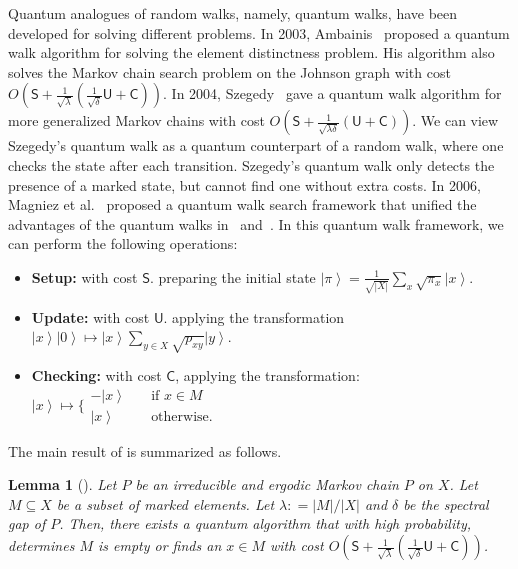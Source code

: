 \documentclass[10pt,a4paper]{article}
\newtheorem{lemma}[theorem]{Lemma}
\renewcommand{\varepsilon}{\lambda}
\newcommand{\ket}[1]{\left| #1 \right\rangle}
\begin{document}
Quantum analogues of random walks, namely, quantum walks, have been developed for solving different problems. In 2003, Ambainis~\cite{r5} proposed a quantum walk algorithm for solving the element distinctness problem. His algorithm also solves the Markov chain search problem on the Johnson graph with cost $O(\mathsf{S} + \frac{1}{\sqrt{\varepsilon}}(\frac{1}{\sqrt{\delta}}\mathsf{U} + \mathsf{C}))$. In 2004, Szegedy~\cite{r45} gave a quantum walk algorithm for more generalized Markov chains with cost $O(\mathsf{S} + \frac{1}{\sqrt{\varepsilon\delta}}(\mathsf{U} + \mathsf{C}))$. We can view Szegedy's quantum walk as a quantum counterpart of a random walk, where one checks the state after each transition. Szegedy's quantum walk only detects the presence of a marked state, but cannot find one without extra costs. In 2006, Magniez et al.~\cite{r33} proposed a quantum walk search framework that unified the advantages of the quantum walks in~\cite{r5} and~\cite{r45}. In this quantum walk framework, we can perform the following operations:
\begin{itemize}
  \item \textbf{Setup:} with cost $\mathsf{S}$. preparing the initial state $\ket{\pi} = \frac{1}{\sqrt{|X|}}\sum_{x}\sqrt{\pi_x}\ket{x}$.
  \item \textbf{Update:}  with cost $\mathsf{U}$. applying the transformation $\ket{x}\ket{0} \mapsto \ket{x}\sum_{y\in X}\sqrt{p_{xy}}\ket{y}$.
  \item \textbf{Checking:} with cost $\mathsf{C}$, applying the transformation: $\ket{x} \mapsto \big\{\begin{smallmatrix} -\ket{x} \quad &\text{if $x\in M$} \\ \ket{x} \quad &\text{otherwise.}\end{smallmatrix}$
\end{itemize}
The main result of \cite{r33} is summarized as follows.
\begin{lemma}[\cite{r33}]
  \label{lem:framework}
  Let $P$ be an irreducible and ergodic Markov chain $P$ on $X$. Let $M \subseteq X$ be a subset of marked elements. Let $\varepsilon: = |M|/|X|$ and $\delta$ be the spectral gap of $P$. Then, there exists a quantum algorithm that with high probability, determines $M$ is empty or finds an $x \in M$ with cost $O(\mathsf{S} + \frac{1}{\sqrt{\varepsilon}}(\frac{1}{\sqrt{\delta}}\mathsf{U} + \mathsf{C}))$.
\end{lemma}
\end{document}
